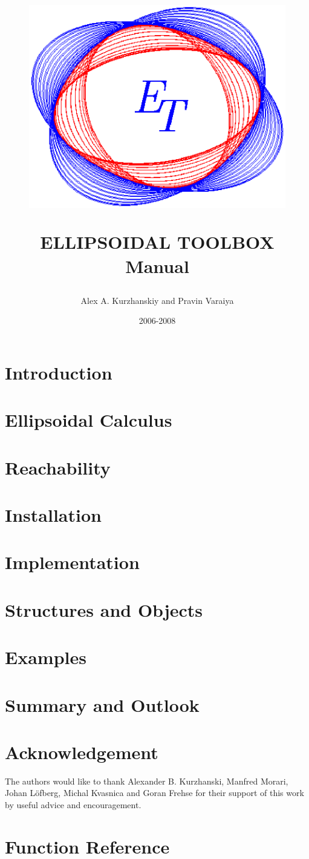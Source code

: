 \documentclass{report}
\title{
\begin{figure}[htbp]
\centerline{
\includegraphics[height=5 cm]{logo.eps}}
\end{figure}
ELLIPSOIDAL TOOLBOX\\
Manual
\author{Alex A. Kurzhanskiy and Pravin Varaiya}
\date{2006-2008}
}
\numberwithin{equation}{section}
\begin{document}
\maketitle
\tableofcontents



\chapter{Introduction}\label{ch_intro}


\chapter{Ellipsoidal Calculus}\label{ch_ellcalc}


\chapter{Reachability}\label{ch_reachability}


\chapter{Installation}\label{ch_install}


\chapter{Implementation}\label{ch_implementation}


\chapter{Structures and Objects}\label{ch_objects}


\chapter{Examples}\label{ch_examples}


\chapter{Summary and Outlook}\label{ch_summary}


\chapter*{Acknowledgement}
The authors would like to thank Alexander B. Kurzhanski,
Manfred Morari, Johan L{\"o}fberg, Michal Kvasnica and Goran Frehse
for their support of this work by useful advice and encouragement.





\appendix
\chapter{Function Reference}\label{appendix_a}

\end{document}
